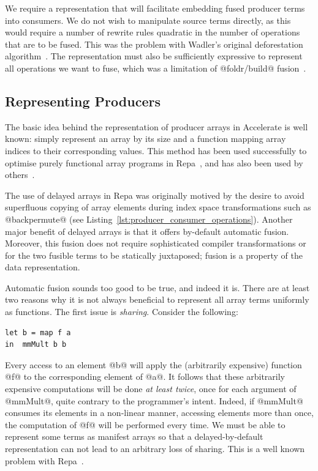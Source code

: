 We require a representation that will facilitate embedding fused producer
terms into consumers. We do not wish to manipulate source terms directly, as
this would require a number of rewrite rules quadratic in the number of
operations that are to be fused. This was the problem with Wadler's original
deforestation algorithm~\cite{Wadler:1981hy,Wadler:1990ix}. The representation
must also be sufficiently expressive to represent all operations we want to
fuse, which was a limitation of @foldr/build@
fusion~\cite{Gill:1993de}.


\subsection{Representing Producers}
\label{sec:representing_producers}

The basic idea behind the representation of producer arrays in Accelerate is
well known: simply represent an array by its size and a function mapping array
indices to their corresponding values. This method has been used successfully to
optimise purely functional array programs in Repa~\cite{Keller:2010er}, and has also been used by
others~\cite{Claessen:2012hl}.

The use of delayed arrays in Repa was originally motived by the desire to avoid
superfluous copying of array elements during index space transformations such as
@backpermute@ (see Listing~\ref{lst:producer_consumer_operations}). Another
major benefit of delayed arrays is that it offers by-default automatic fusion.
Moreover, this fusion does not require sophisticated compiler transformations or
for the two fusible terms to be statically juxtaposed; fusion is a property of
the data representation.

Automatic fusion sounds too good to be true, and indeed it is. There are at
least two reasons why it is not always beneficial to represent all array terms
uniformly as functions. The first issue is \emph{sharing}. Consider the
following:
%
\begin{lstlisting}[style=haskell]
let b = map f a
in  mmMult b b
\end{lstlisting}
%
Every access to an element @b@ will apply the (arbitrarily expensive)
function @f@ to the corresponding element of @a@. It follows that
these arbitrarily expensive computations will be done \emph{at least twice},
once for each argument of @mmMult@, quite contrary to the programmer's
intent. Indeed, if @mmMult@ consumes its elements in a non-linear manner,
accessing elements more than once, the computation of @f@ will be performed
every time. We must be able to represent some terms as manifest arrays so that a
delayed-by-default representation can not lead to an arbitrary loss of sharing.
This is a well known problem with Repa~\cite{Lippmeier:2012g}.

